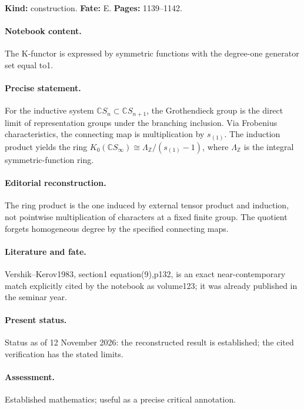 \label{item:1983-614.16}

\noindent\textbf{Kind:} construction. \textbf{Fate:} E. \textbf{Pages:} 1139--1142.\par

\paragraph{Notebook content.} The K-functor is expressed by symmetric functions with the degree-one generator set equal to1.

\paragraph{Precise statement.} For the inductive system $\mathbb CS_n\subset\mathbb CS_{n+1}$, the Grothendieck group is the direct limit of representation groups under the branching inclusion. Via Frobenius characteristics, the connecting map is multiplication by $s_{(1)}$. The induction product yields the ring $K_0(\mathbb CS_\infty)\cong\Lambda_{\mathbb Z}/(s_{(1)}-1)$, where $\Lambda_{\mathbb Z}$ is the integral symmetric-function ring.

\paragraph{Editorial reconstruction.} The ring product is the one induced by external tensor product and induction, not pointwise multiplication of characters at a fixed finite group. The quotient forgets homogeneous degree by the specified connecting maps.

\paragraph{Literature and fate.} Vershik--Kerov1983, section1 equation(9),p132, is an exact near-contemporary match explicitly cited by the notebook as volume123; it was already published in the seminar year.

\paragraph{Present status.} Status as of 12 November 2026: the reconstructed result is established; the cited verification has the stated limits.

\paragraph{Assessment.} Established mathematics; useful as a precise critical annotation.

